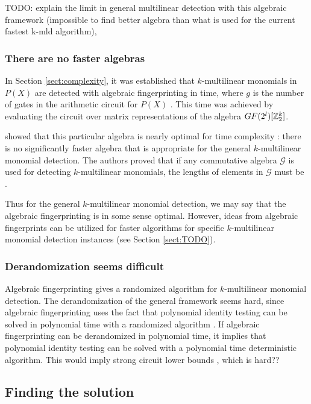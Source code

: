 TODO: explain the limit in general multilinear detection with this algebraic framework 
(impossible to find better algebra than what is used for the current fastest k-mld algorithm), \cite{KouWil09}

\subsubsection{There are no faster algebras}

In Section \ref{sect:complexity}, it was established that $k$-multilinear monomials 
in $P(X)$ are detected with 
algebraic fingerprinting in  time, where 
$g$ is the number of gates in the arithmetic circuit for $P(X)$ \cite{Williams09}. 
This time was achieved by evaluating the circuit over matrix 
representations of the algebra $GF(2^l)[\mathbb Z_2^k]$.

\citeauthor{KouWil09} showed that this particular algebra is nearly optimal 
for time complexity \cite{KouWil09}: there is no significantly faster algebra that 
is appropriate for the general $k$-multilinear monomial detection. 
The authors proved that if any commutative algebra $\mathcal{G}$ is 
used for detecting $k$-multilinear monomials, 
the lengths of elements in $\mathcal{G}$ must be .

Thus for the general $k$-multilinear monomial detection, we may say 
that the algebraic fingerprinting is in some sense optimal. 
However, 
ideas from algebraic fingerprints can be utilized for faster algorithms for 
specific $k$-multilinear monomial detection instances (see Section \ref{sect:TODO}).

\subsubsection{Derandomization seems difficult}

Algebraic fingerprinting gives a randomized algorithm for $k$-multilinear monomial detection. 
The derandomization of the general framework seems hard, since algebraic fingerprinting 
uses the fact that polynomial identity testing can be solved in polynomial time with 
a randomized algorithm \cite{Williams09}. If algebraic fingerprinting can be derandomized 
in polynomial time, it implies that polynomial identity testing can be solved with a 
polynomial time deterministic algorithm. This would imply strong circuit lower bounds \cite{TODO}, 
which is hard??

\subsection{Finding the solution}
\label{sect:finding_the_solution}

